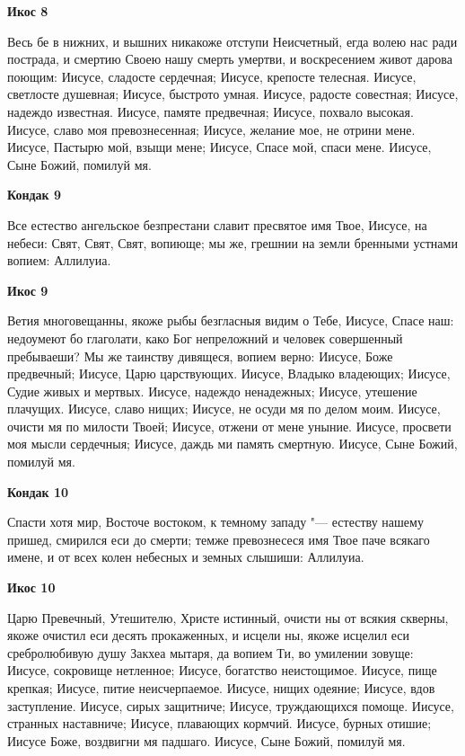 \medskip
\bfseries Икос 8\normalfont{}\nopagebreak


Весь
бе в нижних, и вышних никакоже отступи Неисчетный, егда волею нас ради пострада, и смертию Своею нашу смерть умертви, и воскресением живот дарова поющим: Иисусе, сладосте сердечная; Иисусе, крепосте телесная. Иисусе, светлосте душевная; Иисусе, быстрото умная. Иисусе, радосте совестная; Иисусе, надеждо известная. Иисусе, памяте предвечная; Иисусе, похвало высокая. Иисусе, славо моя превознесенная; Иисусе, желание мое, не отрини мене. Иисусе, Пастырю мой, взыщи мене; Иисусе, Спасе мой, спаси мене. Иисусе, Сыне Божий, помилуй мя. 


\medskip
\bfseries Кондак 9\normalfont{}\nopagebreak


Все
естество ангельское безпрестани славит пресвятое имя Твое, Иисусе, на небеси: Свят, Свят, Свят, вопиюще; мы же, грешнии на земли бренными устнами вопием: Аллилуиа. 


\medskip
\bfseries Икос 9\normalfont{}\nopagebreak


Ветия
многовещанны, якоже рыбы безгласныя видим о Тебе, Иисусе, Спасе наш: недоумеют бо глаголати, како Бог непреложний и человек совершенный пребываеши? Мы же таинству дивящеся, вопием верно: Иисусе, Боже предвечный; Иисусе, Царю царствующих. Иисусе, Владыко владеющих; Иисусе, Судие живых и мертвых. Иисусе, надеждо ненадежных; Иисусе, утешение плачущих. Иисусе, славо нищих; Иисусе, не осуди мя по делом моим. Иисусе, очисти мя по милости Твоей; Иисусе, отжени от мене уныние. Иисусе, просвети моя мысли сердечныя; Иисусе, даждь ми память смертную. Иисусе, Сыне Божий, помилуй мя.


\medskip
\bfseries Кондак 10\normalfont{}\nopagebreak


Спасти
хотя мир, Восточе востоком, к темному западу "--- естеству нашему пришед, смирился еси до смерти; темже превознесеся имя Твое паче всякаго имене, и от всех колен небесных и земных слышиши: Аллилуиа.


\medskip
\bfseries Икос 10\normalfont{}\nopagebreak


Царю
Превечный, Утешителю, Христе истинный, очисти ны от всякия скверны, якоже очистил еси десять прокаженных, и исцели ны, якоже исцелил еси сребролюбивую душу Закхеа мытаря, да вопием Ти, во умилении зовуще: Иисусе, сокровище нетленное; Иисусе, богатство неистощимое. Иисусе, пище крепкая; Иисусе, питие неисчерпаемое. Иисусе, нищих одеяние; Иисусе, вдов заступление. Иисусе, сирых защитниче; Иисусе, труждающихся помоще. Иисусе, странных наставниче; Иисусе, плавающих кормчий. Иисусе, бурных отишие; Иисусе Боже, воздвигни мя падшаго. Иисусе, Сыне Божий, помилуй мя.


